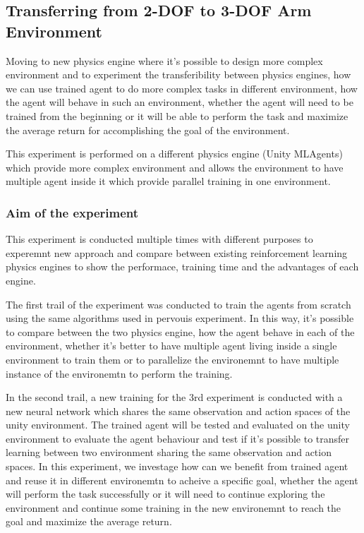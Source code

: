 
\subsection{Transferring from 2-DOF to 3-DOF Arm Environment}

Moving to new physics engine where it's possible to design more complex environment and to experiment the transferibility between physics engines, how we can use trained agent to do more complex tasks in different environment, how the agent will behave in such an environment, whether the agent will need to be trained from the beginning or it will be able to perform the task and maximize the average return for accomplishing the goal of the environment.


This experiment is performed on a different physics engine (Unity MLAgents) which provide more complex environment and allows the environment to have multiple agent inside it which provide parallel training in one environment.

\subsubsection{Aim of the experiment}

This experiment is conducted multiple times with different purposes to experemnt new approach and compare between existing reinforcement learning physics engines to show the performace, training time and the advantages of each engine.

The first trail of the experiment was conducted to train the agents from scratch using the same algorithms used in pervouis experiment. In this way, it's possible to compare between the two physics engine, how the agent behave in each of the environment, whether it's better to have multiple agent living inside a single environment to train them or to parallelize the environemnt to have multiple instance of the environemtn to perform the training. 

In the second trail, a new training for the 3rd experiment is conducted with a new neural network which shares the same observation and action spaces of the unity environment. The trained agent will be tested and evaluated on the unity environment to evaluate the agent behaviour and test if it's possible to transfer learning between two environment sharing the same observation and action spaces. In this experiment, we investage how can we benefit from trained agent and reuse it in different environemtn to acheive a specific goal, whether the agent will perform the task successfully or it will need to continue exploring the environment and continue some training in the new environemnt to reach the goal and maximize the average return.

